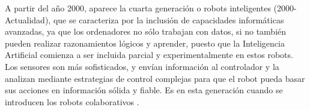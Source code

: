 A partir del año 2000, aparece la cuarta generación o robots inteligentes (2000-Actualidad), que se caracteriza por la inclusión de capacidades informáticas avanzadas, ya que los ordenadores no sólo trabajan con datos, si no también pueden realizar razonamientos lógicos y aprender, puesto que la Inteligencia Artificial comienza a ser incluida parcial y experimentalmente en estos robots. Los sensores son más sofisticados, y envían información al controlador y la analizan mediante estrategias de control complejas para que el robot pueda basar sus acciones en información sólida y fiable. Es en esta generación cuando se introducen los robots colaborativos \cite{Zamalloa17}.

  
  
  

  
